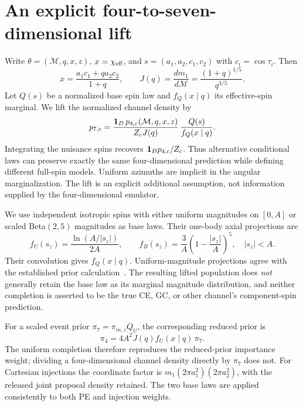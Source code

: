 \section{An explicit four-to-seven-dimensional lift}
Write $\theta=(\mathcal M,q,x,z)$, $x=\chi_{\rm eff}$, and $s=(a_1,a_2,c_1,c_2)$ with $c_i=\cos\tau_i$. Then
\begin{equation}\label{eq:spin}
x=\frac{a_1c_1+q a_2c_2}{1+q},\qquad
J(q)=\frac{d m_1}{d\mathcal M}=\frac{(1+q)^{1/5}}{q^{3/5}}.
\end{equation}
Let $Q(s)$ be a normalized base spin law and $f_Q(x\mid q)$ its effective-spin marginal. We lift the normalized channel density by
\begin{equation}\label{eq:lift}
p_{7,c}=\frac{\mathbf{1}_D\,p_{4,c}(\mathcal M,q,x,z)}{Z_c J(q)}\,
\frac{Q(s)}{f_Q(x\mid q)}.
\end{equation}
Integrating the nuisance spins recovers $\mathbf{1}_D p_{4,c}/Z_c$. Thus alternative conditional laws can preserve exactly the same four-dimensional prediction while defining different full-spin models. Uniform azimuths are implicit in the angular marginalization. The lift is an explicit additional assumption, not information supplied by the four-dimensional emulator.

We use independent isotropic spins with either uniform magnitudes on $[0,A]$ or scaled Beta$(2,5)$ magnitudes as base laws. Their one-body axial projections are
\begin{equation}\label{eq:axial}
f_U(s_z)=\frac{\ln(A/|s_z|)}{2A},\qquad
f_B(s_z)=\frac{3}{A}\left(1-\frac{|s_z|}{A}\right)^5,\quad |s_z|<A.
\end{equation}
Their convolution gives $f_Q(x\mid q)$. Uniform-magnitude projections agree with the established prior calculation~\cite{callister}. The resulting lifted population does \emph{not} generally retain the base law as its marginal magnitude distribution, and neither completion is asserted to be the true CE, GC, or other channel's component-spin prediction.

For a scaled event prior $\pi_7=\pi_{m,z}Q_U$, the corresponding reduced prior is
\begin{equation}\label{eq:reduced}
\pi_4=4A^2 J(q) f_U(x\mid q)\,\pi_7.
\end{equation}
The uniform completion therefore reproduces the reduced-prior importance weight; dividing a four-dimensional channel density directly by $\pi_7$ does not. For Cartesian injections the coordinate factor is $m_1(2\pi a_1^2)(2\pi a_2^2)$, with the released joint proposal density retained. The two base laws are applied consistently to both PE and injection weights.

